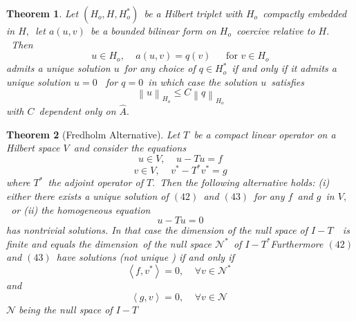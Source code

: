 \documentclass{article}
\newtheorem{theorem}{Theorem}
\begin{document}
\begin{theorem}
\textit{Let }$\left( H_{o},H,H_{o}^{\ast }\right) $\textit{\ be a Hilbert
triplet with }$H_{o}$\textit{\ compactly embedded in }$H,$\textit{\ let }$%
a(u,v)$\textit{\ be a bounded bilinear form on }$H_{o}$\textit{\ coercive
relative to }$H.$\textit{\ Then }%
\begin{equation*}
u\in H_{o},\ \ \ \ \ a(u,v)=q(v)\ \ \ \ \ \ \ \text{for }v\in H_{o}
\end{equation*}%
\textit{admits a unique solution }$u$\textit{\ for any choice of }$q\in
H_{o}^{\ast }$\textit{\ if and only if it admits a unique solution }$u=0$%
\textit{\ for }$q=0$\textit{\ in which case the solution }$u$\textit{\
satisfies }%
\begin{equation*}
\left\| u\right\| _{H_{o}}\leq C\left\| q\right\| _{H_{o}}
\end{equation*}%
\textit{with }$C$\textit{\ dependent only on }$\hat{A}.$
\end{theorem}

\begin{theorem}[Fredholm Alternative]
\textit{Let }$T$\textit{\ be a compact linear operator on a Hilbert space }$%
V $\textit{\ and consider the equations }%
\begin{equation}
u\in V,\;\;\;\;u-Tu=f
\end{equation}%
\begin{equation}
v\in V,\;\;\;\;v^{\ast }-T^{\ast }v^{\ast }=g
\end{equation}%
\textit{where }$T^{\ast }$\textit{\ the adjoint operator of }$T.$\textit{\
Then the following alternative holds:\newline
(i) either there exists a unique solution of }$\left( 42\right) $\textit{\
and }$\left( 43\right) $\textit{\ for any }$f$\textit{\ and }$g$\textit{\ in 
}$V,$\textit{\ or}\newline
\textit{(ii) the homogeneous equation}%
\begin{equation*}
u-Tu=0
\end{equation*}%
\textit{has nontrivial solutions. In that case the dimension of the null
space of }$I-T$\textit{\ \ is finite and equals the dimension\ of the null
space }$\mathcal{N}^{\ast }$\textit{\ of }$I-T^{\ast }$\textit{Furthermore }$%
\left( 42\right) $ \textit{and} $\left( 43\right) $\textit{\ have solutions
(not unique ) if and only if }%
\begin{equation*}
\left\langle f,v^{\ast }\right\rangle =0,\;\;\;\;\forall v\in \mathcal{N}%
^{\ast }\;
\end{equation*}%
\textit{and \ }%
\begin{equation*}
\left\langle g,v\right\rangle =0,\;\;\;\;\forall v\in \mathcal{N}\;
\end{equation*}%
$\mathcal{N}\;$being the null space of $I-T$
\end{theorem}
\end{document}

